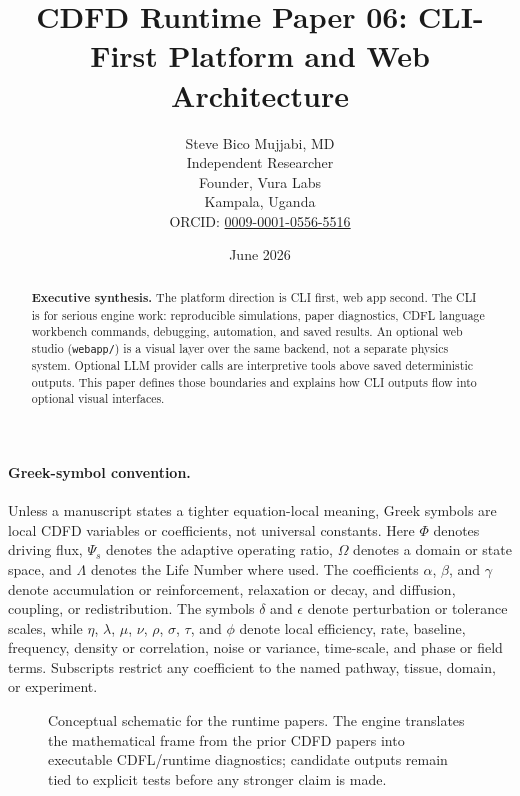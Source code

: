 \documentclass[12pt,a4paper]{article}
\title{\textbf{CDFD Runtime Paper 06: CLI-First Platform and Web Architecture}}
\author{Steve Bico Mujjabi, MD\\
\small Independent Researcher\\
\small Founder, Vura Labs\\
\small Kampala, Uganda\\
\small ORCID: \href{https://orcid.org/0009-0001-0556-5516}{0009-0001-0556-5516}}
\date{June 2026}
\begin{document}
\maketitle

\begin{abstract}
\noindent \textbf{Executive synthesis.} The platform direction is CLI first,
web app second. The CLI is for serious engine work: reproducible simulations,
paper diagnostics, CDFL language workbench commands, debugging, automation, and
saved results. An optional web studio (\texttt{webapp/}) is a visual layer over
the same backend, not a separate physics system. Optional LLM provider calls are
interpretive tools above saved deterministic outputs. This paper defines those
boundaries and explains how CLI outputs flow into optional visual interfaces.
\end{abstract}

\paragraph{Greek-symbol convention.}
Unless a manuscript states a tighter equation-local meaning, Greek symbols are local CDFD variables or coefficients, not universal constants. Here $\Phi$ denotes driving flux, $\Psi_s$ denotes the adaptive operating ratio, $\Omega$ denotes a domain or state space, and $\Lambda$ denotes the Life Number where used. The coefficients $\alpha$, $\beta$, and $\gamma$ denote accumulation or reinforcement, relaxation or decay, and diffusion, coupling, or redistribution. The symbols $\delta$ and $\epsilon$ denote perturbation or tolerance scales, while $\eta$, $\lambda$, $\mu$, $\nu$, $\rho$, $\sigma$, $\tau$, and $\phi$ denote local efficiency, rate, baseline, frequency, density or correlation, noise or variance, time-scale, and phase or field terms. Subscripts restrict any coefficient to the named pathway, tissue, domain, or experiment.


\begin{figure}[ht]
\centering
{}
\caption{Conceptual schematic for the runtime papers. The engine translates the mathematical frame from the prior CDFD papers into executable CDFL/runtime diagnostics; candidate outputs remain tied to explicit tests before any stronger claim is made.}
\end{figure}
\end{document}
